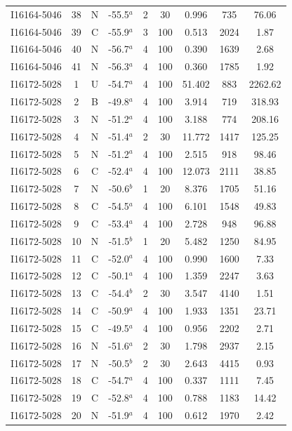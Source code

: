 \begin{table}
\begin{tabular}{ccccccccc}
I16164-5046 & 38 & N & -55.5$^{a}$ & 2 & 30 & 0.996 & 735 & 76.06 \\
I16164-5046 & 39 & C & -55.9$^{a}$ & 3 & 100 & 0.513 & 2024 & 1.87 \\
I16164-5046 & 40 & N & -56.7$^{a}$ & 4 & 100 & 0.390 & 1639 & 2.68 \\
I16164-5046 & 41 & N & -56.3$^{a}$ & 4 & 100 & 0.360 & 1785 & 1.92 \\
I16172-5028 & 1 & U & -54.7$^{a}$ & 4 & 100 & 51.402 & 883 & 2262.62 \\
I16172-5028 & 2 & B & -49.8$^{a}$ & 4 & 100 & 3.914 & 719 & 318.93 \\
I16172-5028 & 3 & N & -51.2$^{a}$ & 4 & 100 & 3.188 & 774 & 208.16 \\
I16172-5028 & 4 & N & -51.4$^{a}$ & 2 & 30 & 11.772 & 1417 & 125.25 \\
I16172-5028 & 5 & N & -51.2$^{a}$ & 4 & 100 & 2.515 & 918 & 98.46 \\
I16172-5028 & 6 & C & -52.4$^{a}$ & 4 & 100 & 12.073 & 2111 & 38.85 \\
I16172-5028 & 7 & N & -50.6$^{b}$ & 1 & 20 & 8.376 & 1705 & 51.16 \\
I16172-5028 & 8 & C & -54.5$^{a}$ & 4 & 100 & 6.101 & 1548 & 49.83 \\
I16172-5028 & 9 & C & -53.4$^{a}$ & 4 & 100 & 2.728 & 948 & 96.88 \\
I16172-5028 & 10 & N & -51.5$^{b}$ & 1 & 20 & 5.482 & 1250 & 84.95 \\
I16172-5028 & 11 & C & -52.0$^{a}$ & 4 & 100 & 0.990 & 1600 & 7.33 \\
I16172-5028 & 12 & C & -50.1$^{a}$ & 4 & 100 & 1.359 & 2247 & 3.63 \\
I16172-5028 & 13 & C & -54.4$^{b}$ & 2 & 30 & 3.547 & 4140 & 1.51 \\
I16172-5028 & 14 & C & -50.9$^{a}$ & 4 & 100 & 1.933 & 1351 & 23.71 \\
I16172-5028 & 15 & C & -49.5$^{a}$ & 4 & 100 & 0.956 & 2202 & 2.71 \\
I16172-5028 & 16 & N & -51.6$^{a}$ & 2 & 30 & 1.798 & 2937 & 2.15 \\
I16172-5028 & 17 & N & -50.5$^{b}$ & 2 & 30 & 2.643 & 4415 & 0.93 \\
I16172-5028 & 18 & C & -54.7$^{a}$ & 4 & 100 & 0.337 & 1111 & 7.45 \\
I16172-5028 & 19 & C & -52.8$^{a}$ & 4 & 100 & 0.788 & 1183 & 14.42 \\
I16172-5028 & 20 & N & -51.9$^{a}$ & 4 & 100 & 0.612 & 1970 & 2.42 \\

\end{tabular}
\end{table}

